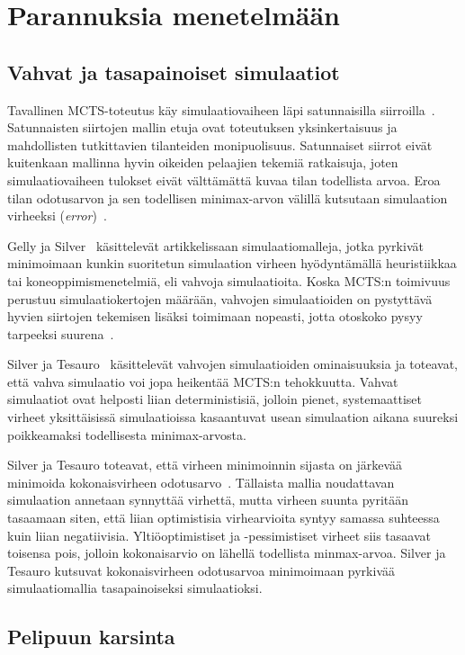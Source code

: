 \documentclass[12pt,finnish]{tktltiki2}
\theoremstyle{definition}
\theoremstyle{remark}
\begin{document}
\section{Parannuksia menetelmään}

\subsection{Vahvat ja tasapainoiset simulaatiot}

Tavallinen MCTS-toteutus käy simulaatiovaiheen läpi satunnaisilla siirroilla~\cite{browne}. Satunnaisten siirtojen mallin etuja ovat toteutuksen yksinkertaisuus ja mahdollisten tutkittavien tilanteiden monipuolisuus. Satunnaiset siirrot eivät kuitenkaan mallinna hyvin oikeiden pelaajien tekemiä ratkaisuja, joten simulaatiovaiheen tulokset eivät välttämättä kuvaa tilan todellista arvoa. Eroa tilan odotusarvon ja sen todellisen minimax-arvon välillä kutsutaan simulaation virheeksi (\textit{error})~\cite{silver}.

Gelly ja Silver~\cite{gellysilver} käsittelevät artikkelissaan simulaatiomalleja, jotka pyrkivät minimoimaan kunkin suoritetun simulaation virheen hyödyntämällä heuristiikkaa tai koneoppimismenetelmiä, eli vahvoja simulaatioita. Koska MCTS:n toimivuus perustuu simulaatiokertojen määrään, vahvojen simulaatioiden on pystyttävä hyvien siirtojen tekemisen lisäksi toimimaan nopeasti, jotta otoskoko pysyy tarpeeksi suurena~\cite{browne}.

Silver ja Tesauro~\cite{silver} käsittelevät vahvojen simulaatioiden ominaisuuksia ja toteavat, että vahva simulaatio voi jopa heikentää MCTS:n tehokkuutta. Vahvat simulaatiot ovat helposti liian deterministisiä, jolloin pienet, systemaattiset virheet yksittäisissä simulaatioissa kasaantuvat usean simulaation aikana suureksi poikkeamaksi todellisesta minimax-arvosta.

Silver ja Tesauro toteavat, että virheen minimoinnin sijasta on järkevää minimoida kokonaisvirheen odotusarvo~\cite{silver}. Tällaista mallia noudattavan simulaation annetaan synnyttää virhettä, mutta virheen suunta pyritään tasaamaan siten, että liian optimistisia virhearvioita syntyy samassa suhteessa kuin liian negatiivisia. Yltiöoptimistiset ja -pessimistiset virheet siis tasaavat toisensa pois, jolloin kokonaisarvio on lähellä todellista minmax-arvoa. Silver ja Tesauro kutsuvat kokonaisvirheen odotusarvoa minimoimaan pyrkivää simulaatiomallia tasapainoiseksi simulaatioksi.


\subsection{Pelipuun karsinta}
\end{document}
